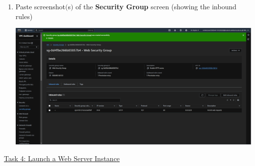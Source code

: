 \documentclass[11pt]{article}
\begin{document}
\begin{enumerate}[resume]
    
    \item Paste screenshot$($s$)$ of the \textbf{Security Group} screen (showing the inbound rules) \\
    \vspace{1mm}

    {\centering
    \includegraphics[width=5.8in]{pics/13.png}
    }

\end{enumerate}


\vspace{0.2cm}

\noindent\underline{Task 4: Launch a Web Server Instance}
\end{document}
